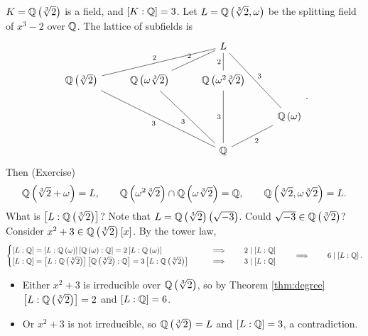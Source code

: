 $ K = \mathbb{Q}\left( \sqrt[3]{2} \right) $ is a field, and $ \left[ K : \mathbb{Q} \right] = 3 $. Let $ L = \mathbb{Q}\left( \sqrt[3]{2}, \omega \right) $ be the splitting field of $ x^3 - 2 $ over $ \mathbb{Q} $. The lattice of subfields is
$$
\begin{tikzcd}
& & L & \\
\Q\rb{\sqrt[3]{2}} \arrow[dash]{urr}{2} & \Q\rb{\omega\sqrt[3]{2}} \arrow[dash]{ur}{2} & \Q\rb{\omega^2\sqrt[3]{2}} \arrow[dash]{u}{2} & \\
& & & \Q\rb{\omega} \arrow[dash, swap]{uul}{3} \\
& & \Q \arrow[dash]{uull}{3} \arrow[dash]{uul}{3} \arrow[dash]{uu}{3} \arrow[dash, swap]{ur}{2} &
\end{tikzcd}.
$$
Then (Exercise)
$$ \mathbb{Q}\left( \sqrt[3]{2} + \omega \right) = L, \qquad \mathbb{Q}\left( \omega^2\sqrt[3]{2} \right) \cap \mathbb{Q}\left( \omega\sqrt[3]{2} \right) = \mathbb{Q}, \qquad \mathbb{Q}\left( \sqrt[3]{2}, \omega\sqrt[3]{2} \right) = L. $$
What is $ \left[ L : \mathbb{Q}\left( \sqrt[3]{2} \right) \right] $? Note that $ L = \mathbb{Q}\left( \sqrt[3]{2} \right)\left( \sqrt{-3} \right) $. Could $ \sqrt{-3} \in \mathbb{Q}\left( \sqrt[3]{2} \right) $? Consider $ x^2 + 3 \in \mathbb{Q}\left( \sqrt[3]{2} \right)\left[ x \right] $. By the tower law,
$$
\begin{cases}
\left[ L : \mathbb{Q} \right] = \left[ L : \mathbb{Q}\left( \omega \right) \right]\left[ \mathbb{Q}\left( \omega \right) : \mathbb{Q} \right] = 2\left[ L : \mathbb{Q}\left( \omega \right) \right] & \qquad \implies \qquad 2 \mid \left[ L : \mathbb{Q} \right] \\
\left[ L : \mathbb{Q} \right] = \left[ L : \mathbb{Q}\left( \sqrt[3]{2} \right) \right]\left[ \mathbb{Q}\left( \sqrt[3]{2} \right) : \mathbb{Q} \right] = 3\left[ L : \mathbb{Q}\left( \sqrt[3]{2} \right) \right] & \qquad \implies \qquad 3 \mid \left[ L : \mathbb{Q} \right]
\end{cases}
\qquad \implies \qquad 6 \mid \left[ L : \mathbb{Q} \right].
$$
\begin{itemize}
\item Either $ x^2 + 3 $ is irreducible over $ \mathbb{Q}\left( \sqrt[3]{2} \right) $, so by Theorem \ref{thm:degree} $ \left[ L : \mathbb{Q}\left( \sqrt[3]{2} \right) \right] = 2 $ and $ \left[ L : \mathbb{Q} \right] = 6 $.
\item Or $ x^2 + 3 $ is not irreducible, so $ \mathbb{Q}\left( \sqrt[3]{2} \right) = L $ and $ \left[ L : \mathbb{Q} \right] = 3 $, a contradiction.
\end{itemize}

\pagebreak

